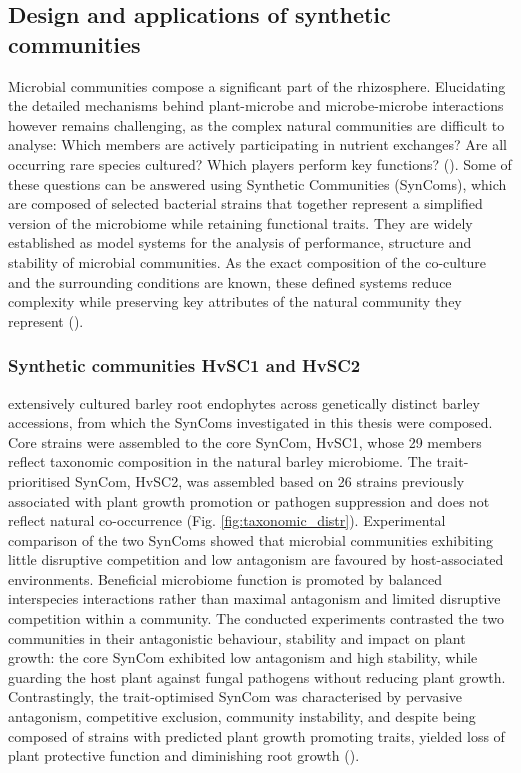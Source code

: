 \subsection{Design and applications of synthetic communities}
Microbial communities compose a significant part of the rhizosphere. Elucidating the detailed mechanisms behind plant-microbe and microbe-microbe interactions however remains challenging, as the complex natural communities are difficult to analyse: Which members are actively participating in nutrient exchanges? Are all occurring rare species cultured? Which players perform key functions? (\cite{shayanthan_role_2022}). Some of these questions can be answered using Synthetic Communities (SynComs), which are composed of selected bacterial strains that together represent a simplified version of the microbiome while retaining functional traits. They are widely established as model systems for the analysis of performance, structure and stability of microbial communities. As the exact composition of the co-culture and the surrounding conditions are known, these defined systems reduce complexity while preserving key attributes of the natural community they represent (\cite{groskopf_synthetic_2014}). 
\subsubsection{Synthetic communities HvSC1 and HvSC2}
\cite{mahdi_low_2026} extensively cultured barley root endophytes across genetically distinct barley accessions, from which the SynComs investigated in this thesis were composed. Core strains were assembled to the core SynCom, HvSC1, whose 29 members reflect taxonomic composition in the natural barley microbiome. The trait-prioritised SynCom, HvSC2, was assembled based on 26 strains previously associated with plant growth promotion or pathogen suppression and does not reflect natural co-occurrence (Fig. \ref{fig:taxonomic_distr}).
Experimental comparison of the two SynComs showed that microbial communities exhibiting little disruptive competition and low antagonism are favoured by host-associated environments. Beneficial microbiome function is promoted by balanced interspecies interactions rather than maximal antagonism and limited disruptive competition within a community. The conducted experiments contrasted the two communities in their antagonistic behaviour, stability and impact on plant growth: the core SynCom exhibited low antagonism and high stability, while guarding the host plant against fungal pathogens without reducing plant growth. Contrastingly, the trait-optimised SynCom was characterised by pervasive antagonism, competitive exclusion, community instability, and despite being composed of strains with predicted plant growth promoting traits, yielded loss of plant protective function and diminishing root growth (\cite{mahdi_low_2026}).

